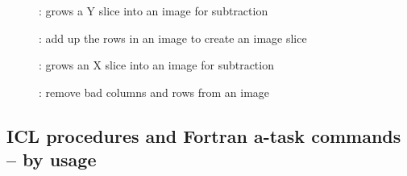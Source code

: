 \begin{description}
\begin{description}
\item []: grows a Y slice into an image for subtraction

\item []: add up the rows in an image to create an
image slice

\item []: grows an X slice into an image for subtraction

\item []: remove bad columns and rows from an image

\end{description}
\end{description}


\newpage
\subsection{\label{ss:commands_by_usage}ICL procedures and Fortran a-task commands -- by usage}

